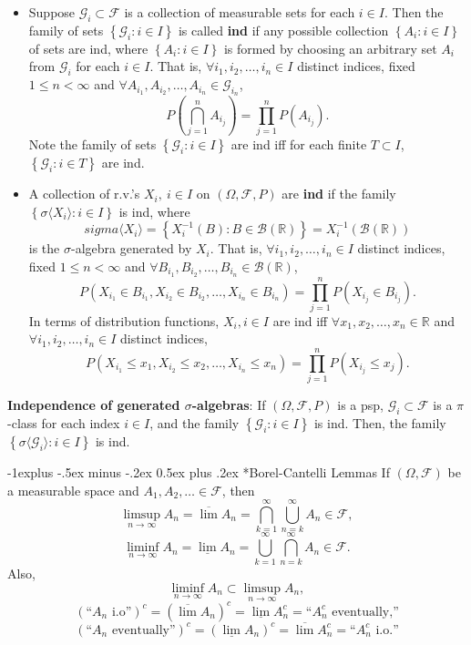 \documentclass[paper=letter,fontsize=3mm]{scrartcl}
\makeatletter
\newcommand{\Borel}{\mathcal{B}}
\newcommand{\R}{\mathbb{R}}
\newcommand\set[1]{\left\{ #1 \right\}}
\renewcommand{\subsection}{\@startsection{subsection}{2}{0mm}%
                                {-1explus -.5ex minus -.2ex}%
                                {0.5ex plus .2ex}%
                                {\normalfont\normalsize\bfseries}}
\makeatother
\begin{document}
\begin{multicols*}{3}
\begin{itemize}
\item
Suppose $\mathcal{G}_i \subset \mathcal{F}$ is a collection of measurable sets for each $i \in I$. Then the family of sets $\set{\mathcal{G}_i : i \in I}$ is called \textbf{ind} if any possible collection $\set{A_i: i \in I}$ of sets are ind, where $\set{A_i:i \in I}$ is formed by choosing an arbitrary set $A_i$ from $\mathcal{G}_i$ for each $i \in I$. That is, $\forall i_1, i_2, \dots, i_n \in I$ distinct indices, fixed $1 \le n < \infty$ and $\forall A_{i_1}, A_{i_2}, \dots, A_{i_n} \in \mathcal{G}_{i_n}$,
$$P\left(\bigcap_{j=1}^n A_{i_j}\right) = \prod_{j=1}^n P\left(A_{i_j}\right).$$
Note the family of sets $\set{\mathcal{G}_i: i \in I}$ are ind iff for each finite $T \subset I$, $\set{\mathcal{G}_i:i \in T}$ are ind.

\item
A collection of r.v.\@'s $X_i, ~i \in I$ on $(\Omega, \mathcal{F}, P)$ are \textbf{ind} if the family $\set{\sigma\langle X_i \rangle: i \in I}$ is ind, where 
$$sigma\langle X_i \rangle = \set{X_i^{-1}(B): B \in \Borel(\R)} = X_i^{-1} (\Borel(\R))$$
is the $\sigma$-algebra generated by $X_i$. That is, $\forall i_1, i_2, \dots, i_n \in I$ distinct indices, fixed $1 \le n < \infty$ and $\forall B_{i_1}, B_{i_2}, \dots, B_{i_n} \in \Borel(\R)$,
$$P\left(X_{i_1} \in B_{i_1}, X_{i_2} \in B_{i_2}, \dots, X_{i_n} \in B_{i_n}\right) = \prod_{j=1}^n P\left(X_{i_j}\in B_{i_j}\right).$$
In terms of distribution functions, $X_i, i \in I$ are ind iff  $\forall x_1, x_2, \dots, x_n \in \R$ and $\forall i_1, i_2, \dots, i_n \in I$ distinct indices,
$$P\left(X_{i_1} \le x_1, X_{i_2} \le x_2, \dots, X_{i_n} \le x_n \right) = \prod_{j=1}^n P\left(X_{i_j}\le x_j\right).$$
\end{itemize}

\textbf{Independence of generated $\sigma$-algebras}: If $(\Omega, \mathcal{F}, P)$ is a psp, $\mathcal{G}_i \subset \mathcal{F}$ is a $\pi$-class for each index $i \in I$, and the family $\set{\mathcal{G}_i: i \in I}$ is ind. Then, the family 
$\set{\sigma\langle\mathcal{G}_i\rangle: i \in I}$ is ind. \\\medskip

\subsection*{Borel-Cantelli Lemmas}
If $(\Omega, \mathcal{F})$ be a measurable space and $A_1, A_2, \dots \in \mathcal{F}$, then
$$\limsup_{n\to\infty} A_n = \overline{\lim} A_n = \bigcap_{k=1}^\infty\bigcup_{n=k}^\infty A_n \in \mathcal{F},$$
$$\liminf_{n\to\infty} A_n = \underline{\lim} A_n = \bigcup_{k=1}^\infty\bigcap_{n=k}^\infty A_n \in \mathcal{F}.$$
Also,
$$\liminf_{n\to\infty} A_n \subset \limsup_{n\to\infty} A_n,$$
$$(\text{``$A_n$ i.o''})^c = \left(\overline{\lim}A_n\right)^c = \underline{\lim}A_n^c = \text{``$A_n^c$  eventually,''}$$
$$(\text{``$A_n$ eventually''})^c = \left(\underline{\lim}A_n\right)^c  = \overline{\lim}A_n^c = \text{``$A_n^c$  i.o.''}$$


\end{multicols*}
\end{document}
